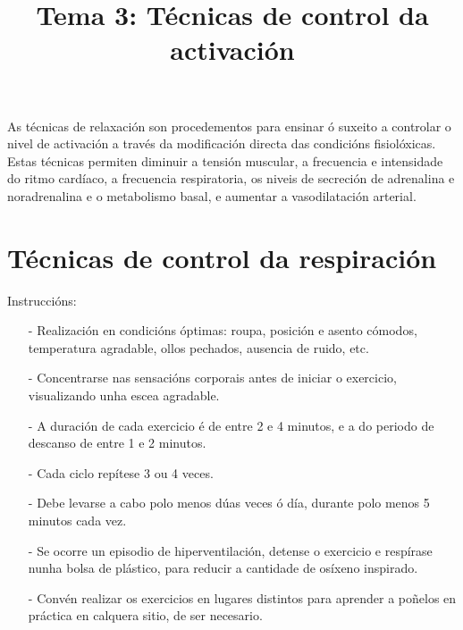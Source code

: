 \documentclass[a4paper,11pt]{article}
\title{Tema 3: Técnicas de control da activación}
\date{}
\begin{document}
   

\maketitle 

As técnicas de relaxación son procedementos para ensinar ó suxeito a controlar o nivel de activación a través da modificación directa das condicións fisiolóxicas. Estas técnicas permiten diminuir a tensión muscular, a frecuencia e intensidade do ritmo cardíaco, a frecuencia respiratoria, os niveis de secreción de adrenalina e noradrenalina e o metabolismo basal, e aumentar a vasodilatación arterial. 

\section{Técnicas de control da respiración}
Instruccións:
\begin{itemize}
	\item[-] Realización en condicións óptimas: roupa, posición e asento cómodos, temperatura 
	agradable, ollos pechados, ausencia de ruido, etc.
	\item[-] Concentrarse nas sensacións corporais antes de iniciar o exercicio, visualizando unha 
	escea agradable.
	\item[-] A duración de cada exercicio é de entre 2 e 4 minutos, e a do periodo de descanso de 
	entre 1 e 2 minutos. 
	\item[-] Cada ciclo repítese 3 ou 4 veces.
	\item[-] Debe levarse a cabo polo menos dúas veces ó día, durante polo menos 5 minutos cada vez.
	\item[-] Se ocorre un episodio de hiperventilación, detense o exercicio e respírase nunha bolsa 
	de plástico, para reducir a cantidade de osíxeno inspirado. 
	\item[-] Convén realizar os exercicios en lugares distintos para aprender a poñelos en práctica 
	en calquera sitio, de ser necesario.
\end{itemize}
\end{document}
